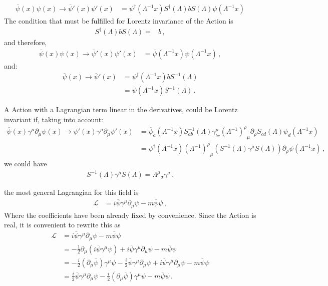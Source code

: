 \begin{align}
  \overline{\psi}(x)\psi(x)\to  \overline{\psi}'(x)\psi'(x)&=
\psi^\dagger\left(\Lambda^{-1}x\right)S^\dagger(\Lambda)b S(\Lambda)\psi\left(\Lambda^{-1}x\right)
\end{align}
The condition that must be fulfilled for Lorentz invariance of the Action is 
\begin{align}
  \label{eq:ltrinscal}
  S^\dagger(\Lambda)bS(\Lambda)=&b\,,
\end{align}
and therefore, 
\begin{align}
  \overline{\psi}(x)\psi(x)\to  \overline{\psi}'(x)\psi'(x)&=
\overline{\psi}\left(\Lambda^{-1}x\right)\psi\left(\Lambda^{-1}x\right)\,,
\end{align}
and:
\begin{align}
  \overline{\psi}(x)\to  \overline{\psi}'(x)&=
\psi^\dagger\left(\Lambda^{-1}x\right)b S^{-1}(\Lambda)\nonumber\\
&=\overline{\psi}\left(\Lambda^{-1}x\right)S^{-1}(\Lambda)\,.
\end{align}


A Action with a Lagrangian term linear in the derivatives, could be Lorentz invariant if, taking into account:
 \begin{align}
   \overline{\psi}(x)\gamma^\mu\partial_\mu\psi(x)\to  \overline{\psi'}(x)\gamma^\mu\partial_\mu\psi'(x)&=
 \overline{\psi}_a\left(\Lambda^{-1}x\right)S^{-1}_{ab}(\Lambda)\gamma^\mu_{bc}{\left(\Lambda^{-1}\right)^\rho}_\mu\partial_\rho S_{cd}(\Lambda)\psi_d\left(\Lambda^{-1}x\right)\nonumber\\
   &=
 \psi^\dagger\left(\Lambda^{-1}x\right){\left(\Lambda^{-1}\right)^\rho}_\mu \left(S^{-1}(\Lambda)\gamma^\mu S(\Lambda)\right)\partial_\rho\psi\left(\Lambda^{-1}x\right)\,,
 \end{align}
we could have
\begin{align}
\label{eq:ltrincond}
  S^{-1}(\Lambda)\gamma^\mu S(\Lambda)={\Lambda^\mu}_\sigma\gamma^\sigma\,.
\end{align}




the most general Lagrangian for this field is
\begin{align}
   \mathcal{L}&=i \overline{\psi} \gamma^\mu\partial_\mu\psi-m\overline{\psi} \psi\,,
\end{align}
Where the coefficients have been already fixed by convenience. Since the Action is real, it is convenient to rewrite this as
\begin{align}
   \mathcal{L}&=i \overline{\psi} \gamma^\mu\partial_\mu\psi-m\overline{\psi} \psi\nonumber\\
&=-\frac{1}{2}\partial_\mu\left(i \overline{\psi} \gamma^\mu\psi\right)+i \overline{\psi} \gamma^\mu\partial_\mu\psi-m\overline{\psi} \psi\nonumber\\
  &=-\frac{i}{2}(\partial_\mu \overline{\psi}) \gamma^\mu\psi-\frac{i}{2} \overline{\psi} \gamma^\mu\partial_\mu\psi+i \overline{\psi} \gamma^\mu\partial_\mu\psi-m\overline{\psi} \psi\nonumber\\
  &=\frac{i}{2} \overline{\psi} \gamma^\mu\partial_\mu\psi-\frac{i}{2}(\partial_\mu \overline{\psi}) \gamma^\mu\psi-m\overline{\psi} \psi\,.
\end{align}
 

